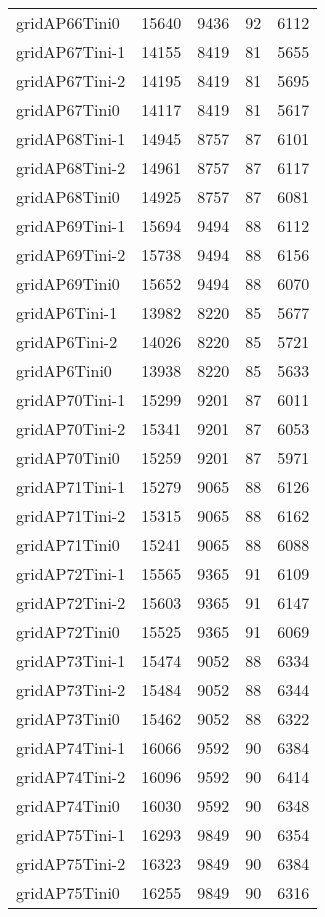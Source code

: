 \begin{longtable}{lrrrr}
gridAP66Tini0 & 15640 & 9436 & 92 & 6112 \\
gridAP67Tini-1 & 14155 & 8419 & 81 & 5655 \\
gridAP67Tini-2 & 14195 & 8419 & 81 & 5695 \\
gridAP67Tini0 & 14117 & 8419 & 81 & 5617 \\
gridAP68Tini-1 & 14945 & 8757 & 87 & 6101 \\
gridAP68Tini-2 & 14961 & 8757 & 87 & 6117 \\
gridAP68Tini0 & 14925 & 8757 & 87 & 6081 \\
gridAP69Tini-1 & 15694 & 9494 & 88 & 6112 \\
gridAP69Tini-2 & 15738 & 9494 & 88 & 6156 \\
gridAP69Tini0 & 15652 & 9494 & 88 & 6070 \\
gridAP6Tini-1 & 13982 & 8220 & 85 & 5677 \\
gridAP6Tini-2 & 14026 & 8220 & 85 & 5721 \\
gridAP6Tini0 & 13938 & 8220 & 85 & 5633 \\
gridAP70Tini-1 & 15299 & 9201 & 87 & 6011 \\
gridAP70Tini-2 & 15341 & 9201 & 87 & 6053 \\
gridAP70Tini0 & 15259 & 9201 & 87 & 5971 \\
gridAP71Tini-1 & 15279 & 9065 & 88 & 6126 \\
gridAP71Tini-2 & 15315 & 9065 & 88 & 6162 \\
gridAP71Tini0 & 15241 & 9065 & 88 & 6088 \\
gridAP72Tini-1 & 15565 & 9365 & 91 & 6109 \\
gridAP72Tini-2 & 15603 & 9365 & 91 & 6147 \\
gridAP72Tini0 & 15525 & 9365 & 91 & 6069 \\
gridAP73Tini-1 & 15474 & 9052 & 88 & 6334 \\
gridAP73Tini-2 & 15484 & 9052 & 88 & 6344 \\
gridAP73Tini0 & 15462 & 9052 & 88 & 6322 \\
gridAP74Tini-1 & 16066 & 9592 & 90 & 6384 \\
gridAP74Tini-2 & 16096 & 9592 & 90 & 6414 \\
gridAP74Tini0 & 16030 & 9592 & 90 & 6348 \\
gridAP75Tini-1 & 16293 & 9849 & 90 & 6354 \\
gridAP75Tini-2 & 16323 & 9849 & 90 & 6384 \\
gridAP75Tini0 & 16255 & 9849 & 90 & 6316 \\

\end{longtable}
